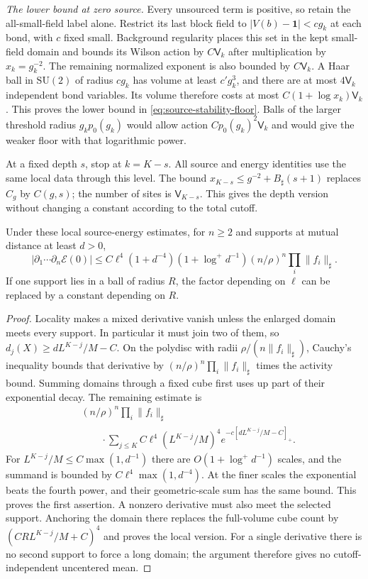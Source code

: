\documentclass[11pt,letterpaper,reqno]{amsart}
\makeatletter
\theoremstyle{definition}
\newcommand{\ms@minorstart}{%
  \pushQED{\qed}\renewcommand{\qedsymbol}{$\blacksquare$}}
\newenvironment{proposition}[1][]{\ms@minorstart\ms@proposition[#1]}
  {\popQED\endms@proposition}
\theoremstyle{remark}
\newcommand{\SU}{\mathrm{SU}}
\makeatother
\begin{document}
\emph{The lower bound at zero source.}
Every unsourced term is positive, so retain the all-small-field
label alone. Restrict its last block field to
$|V(b)-\mathbf1|<cg_k$ at each bond, with $c$ fixed small.
Background regularity places this set in the kept small-field
domain and bounds its Wilson action by $C\mathsf V_k$ after multiplication
by $x_k=g_k^{-2}$. The remaining normalized exponent is also
bounded by $C\mathsf V_k$. A Haar ball in $\SU(2)$ of radius $cg_k$
has volume at least $c'g_k^3$, and there are at most $4\mathsf V_k$
independent bond variables. Its volume therefore costs at most
$C(1+\log x_k)\mathsf V_k$. This proves the lower bound in
\eqref{eq:source-stability-floor}. Balls of the larger threshold
radius $g_kp_0(g_k)$ would allow action $Cp_0(g_k)^2\mathsf V_k$ and
would give the weaker floor with that logarithmic power.

At a fixed depth $s$, stop at $k=K-s$. All source and energy
identities use the same local data through this level. The bound
$x_{K-s}\le g^{-2}+B_\sharp(s+1)$ replaces $C_g$ by $C(g,s)$;
the number of sites is $\mathsf V_{K-s}$. This gives the depth version
without changing a constant according to the total cutoff.

\begin{proposition}[Separated derivatives of the scalar energy]
\label{prop:source-energy-derivatives}
Under these local source-energy estimates, for $n\ge2$ and supports at
mutual distance at least $d>0$,
\[
 |\partial_1\cdots\partial_n\mathcal E(0)|
 \le C\ell^4(1+d^{-4})(1+\log^+d^{-1})
                (n/\rho)^n\prod_i\|f_i\|_\sharp.
\]
If one support lies in a ball of radius $R$, the factor depending on
$\ell$ can be replaced by a constant depending on $R$.
\end{proposition}

\begin{proof}
Locality makes a mixed derivative vanish unless the enlarged domain
meets every support. In particular it must join two of them, so
$d_j(X)\ge dL^{K-j}/M-C$. On the polydisc with radii
$\rho/(n\|f_i\|_\sharp)$, Cauchy's inequality bounds that derivative by
$(n/\rho)^n\prod_i\|f_i\|_\sharp$ times the activity bound.
Summing domains through a fixed cube first uses up part of their
exponential decay. The remaining estimate is
\[
 \begin{aligned}
 &(n/\rho)^n\prod_i\|f_i\|_\sharp\\
 &\qquad\cdot\sum_{j\le K}C\ell^4(L^{K-j}/M)^4
                               e^{-c[dL^{K-j}/M-C]_+}.
 \end{aligned}
\]
For $L^{K-j}/M\le C\max(1,d^{-1})$ there are
$O(1+\log^+d^{-1})$ scales, and the summand is bounded by
$C\ell^4\max(1,d^{-4})$. At the finer scales the exponential beats
the fourth power, and their geometric-scale sum has the same bound.
This proves the first assertion. A nonzero derivative must also meet
the selected support. Anchoring the domain there replaces the
full-volume cube count by
$(CRL^{K-j}/M+C)^4$ and proves the local version. For a single
derivative there is no second support to force a long domain; the
argument therefore gives no cutoff-independent uncentered mean.
\end{proof}
\end{document}
